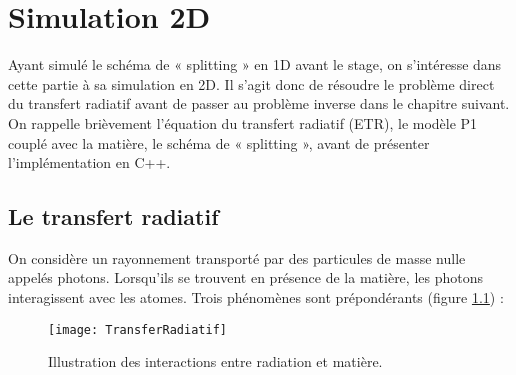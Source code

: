 
\chapter{Simulation 2D} %

\label{Chapter3} %


Ayant simulé le schéma de « splitting » en 1D avant le stage, on s'intéresse dans cette partie à sa simulation en 2D. Il s'agit donc de résoudre le problème direct du transfert radiatif avant de passer au problème inverse dans le chapitre suivant. On rappelle brièvement l'équation du transfert radiatif (ETR), le modèle P1 couplé avec la matière, le schéma de « splitting », avant de présenter l'implémentation en C++.

\section{Le transfert radiatif}

On considère un rayonnement transporté par des particules de masse nulle appelés photons. Lorsqu'ils se trouvent en présence de la matière, les photons interagissent avec les atomes. Trois phénomènes sont prépondérants (figure \ref{fig:TransferRadiatif}) :

\begin{figure}[!h]
\centering
\texttt{[image: TransferRadiatif]} 
\decoRule
\caption[TransferRadiatif]{Illustration des interactions entre radiation et matière.}
\label{fig:TransferRadiatif}
\end{figure}

